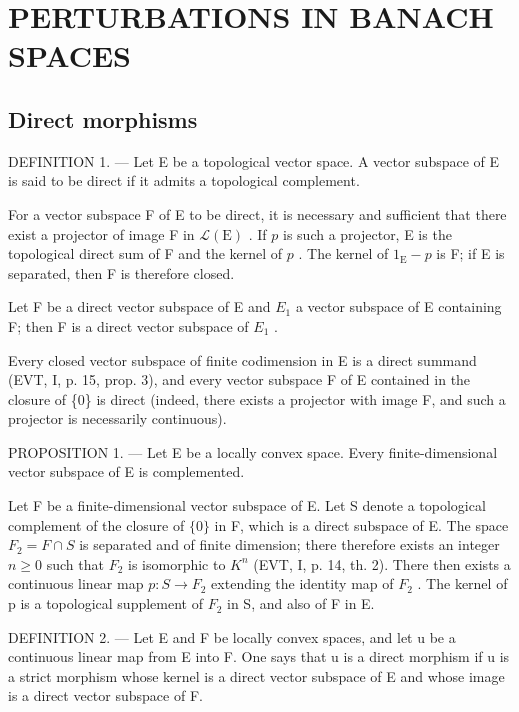 \section{PERTURBATIONS IN BANACH SPACES}

\subsection{Direct morphisms}

DEFINITION 1. --- Let E be a topological vector space. A vector subspace of E is said to be direct if it admits a topological complement.

For a vector subspace F of E to be direct, it is necessary and sufficient that there exist a projector of image F in \(\mathcal{L}(\mathrm{E})\) . If \(p\) is such a projector, E is the topological direct sum of F and the kernel of \(p\) . The kernel of \(1_{\mathrm{E}} - p\) is F; if E is separated, then F is therefore closed.

Let F be a direct vector subspace of E and \(E_{1}\) a vector subspace of E containing F; then F is a direct vector subspace of \(E_{1}\) .

Every closed vector subspace of finite codimension in E is a direct summand (EVT, I, p. 15, prop. 3), and every vector subspace F of E contained in the closure of \{0\} is direct (indeed, there exists a projector with image F, and such a projector is necessarily continuous).

PROPOSITION 1. --- Let E be a locally convex space. Every finite-dimensional vector subspace of E is complemented.

Let F be a finite-dimensional vector subspace of E. Let S denote a topological complement of the closure of \(\{0\}\) in F, which is a direct subspace of E. The space \(F_{2} = F \cap S\) is separated and of finite dimension; there therefore exists an integer \(n \geqslant 0\) such that \(F_{2}\) is isomorphic to \(K^{n}\) (EVT, I, p. 14, th. 2). There then exists a continuous linear map \(p: S \to F_{2}\) extending the identity map of \(F_{2}\) . The kernel of p is a topological supplement of \(F_{2}\) in S, and also of F in E.

DEFINITION 2. --- Let E and F be locally convex spaces, and let u be a continuous linear map from E into F. One says that u is a direct morphism if u is a strict morphism whose kernel is a direct vector subspace of E and whose image is a direct vector subspace of F.

